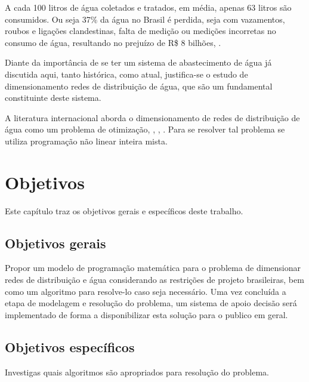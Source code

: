 \documentclass[
	12pt,				%
	openright,			%
	twoside,			%
	a4paper,			%
	english,			%
	french,				%
	spanish,			%
	brazil				%
	]{abntex2}
\begin{document}
A cada 100 litros de água coletados e tratados, em média, apenas 63 litros são consumidos. Ou seja 37\% da água no Brasil é perdida, seja com vazamentos, roubos e ligações clandestinas, falta de medição ou medições incorretas no consumo de água, resultando no prejuízo de R\$ 8 bilhões, \cite{tratabrasil2013}.

Diante da importância de se ter um sistema de abastecimento de água já discutida aqui, tanto histórica, como atual, justifica-se o estudo de dimensionamento redes de distribuição de água, que são um fundamental constituinte deste sistema.

A literatura internacional aborda o dimensionamento de redes de distribuição de água como um problema de otimização, \cite{lansey1989}, \cite{bragalli2006}, \cite{bragalli2012}. Para se resolver tal problema se utiliza programação não linear inteira mista.





\chapter{Objetivos}\label{objetivos}

Este capítulo traz os objetivos gerais e específicos deste trabalho.

\section{Objetivos gerais}

Propor um modelo de programação matemática para o problema de dimensionar redes de distribuição e água
considerando as restrições de projeto brasileiras, bem como um algoritmo para resolve-lo caso seja necessário. 
Uma vez concluída a etapa de modelagem e resolução do problema, um sistema de apoio decisão será implementado de forma a disponibilizar esta solução para o publico em geral.

\section{Objetivos específicos}
Investigas quais algoritmos são apropriados para resolução do problema.
\end{document}
